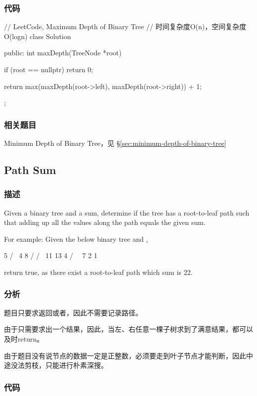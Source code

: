 \subsubsection{代码}

\begin{Code}
// LeetCode, Maximum Depth of Binary Tree
// 时间复杂度O(n)，空间复杂度O(logn)
class Solution {
public:
    int maxDepth(TreeNode *root) {
        if (root == nullptr) return 0;

        return max(maxDepth(root->left), maxDepth(root->right)) + 1;
    }
};
\end{Code}


\subsubsection{相关题目}
\begindot
\item Minimum Depth of Binary Tree，见 \S \ref{sec:minimum-depth-of-binary-tree}
\myenddot


\subsection{Path Sum}
\label{sec:path-sum}


\subsubsection{描述}
Given a binary tree and a sum, determine if the tree has a root-to-leaf path such that adding up all the values along the path equals the given sum.

For example:
Given the below binary tree and ,
\begin{Code}
          5
         / \
        4   8
       /   / \
      11  13  4
     /  \      \
    7    2      1
\end{Code}
return true, as there exist a root-to-leaf path  which sum is 22.


\subsubsection{分析}
题目只要求返回或者，因此不需要记录路径。

由于只需要求出一个结果，因此，当左、右任意一棵子树求到了满意结果，都可以及时return。

由于题目没有说节点的数据一定是正整数，必须要走到叶子节点才能判断，因此中途没法剪枝，只能进行朴素深搜。

\subsubsection{代码}

